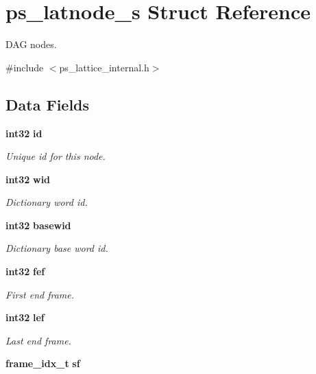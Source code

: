 \section{ps\-\_\-latnode\-\_\-s \-Struct \-Reference}
\label{structps__latnode__s}


\-D\-A\-G nodes.  




{\ttfamily \#include $<$ps\-\_\-lattice\-\_\-internal.\-h$>$}

\subsection*{\-Data \-Fields}
\begin{DoxyCompactItemize}
\item 
{\bf int32} {\bf id}\label{structps__latnode__s_a78243b37753f7a209c15d6adf98ee3f7}

\begin{DoxyCompactList}\small\item\em \-Unique id for this node. \end{DoxyCompactList}\item 
{\bf int32} {\bf wid}\label{structps__latnode__s_afd85dbd410d6e6d970c73088bc6fb97e}

\begin{DoxyCompactList}\small\item\em \-Dictionary word id. \end{DoxyCompactList}\item 
{\bf int32} {\bf basewid}\label{structps__latnode__s_ae3b3dc7d14347e6380859c74b9a02589}

\begin{DoxyCompactList}\small\item\em \-Dictionary base word id. \end{DoxyCompactList}\item 
{\bf int32} {\bf fef}\label{structps__latnode__s_a584ee5a303355d851ac903718998df14}

\begin{DoxyCompactList}\small\item\em \-First end frame. \end{DoxyCompactList}\item 
{\bf int32} {\bf lef}\label{structps__latnode__s_a5c7b9114d131151d6ce85228ea9f829d}

\begin{DoxyCompactList}\small\item\em \-Last end frame. \end{DoxyCompactList}\item 
{\bf frame\-\_\-idx\-\_\-t} {\bf sf}\label{structps__latnode__s_a4171e956043e7856c04d84498f16cf29}


\end{DoxyCompactItemize}
